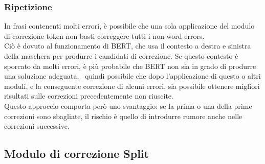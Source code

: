\subsubsection{Ripetizione}
In frasi contenenti molti errori, è possibile che una sola applicazione del modulo di correzione token non basti correggere tutti i non-word errors.\\
Ciò è dovuto al funzionamento di BERT, che usa il contesto a destra e sinistra della maschera per produrre i candidati di correzione. Se questo contesto è sporcato da molti errori, è più probabile che BERT non sia in grado di produrre una soluzione adeguata. \E\ quindi possibile che dopo l'applicazione di questo o altri moduli, e la conseguente correzione di alcuni errori, sia possibile ottenere migliori risultati sulle correzioni precedentemente non riuscite.\\
Questo approccio comporta però uno svantaggio: se la prima o una della prime correzioni sono sbagliate, il rischio è quello di introdurre rumore anche nelle correzioni successive.

\subsection{Modulo di correzione Split}
\label{sec:met_mod_split}

